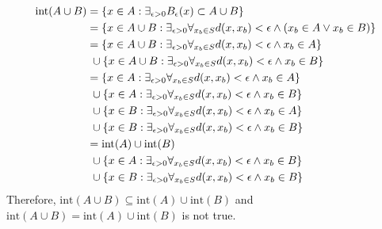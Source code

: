 \documentclass[]{article}
\begin{document}
\begin{align*}
    \text{int}(A \cup B) &= 
        \qty{x \in A : \exists_{\epsilon>0} B_\epsilon(x) \subset A \cup B}\\
    &= \qty{x \in A \cup B : 
        \exists_{\epsilon>0} \forall_{x_b \in S} d(x,x_b)<\epsilon 
        \land (x_b \in A \lor x_b \in B)}\\
    &= \qty{x \in A \cup B : 
            \exists_{\epsilon>0} \forall_{x_b \in S} d(x,x_b)<\epsilon 
            \land x_b \in A}\\
        &\ \cup \qty{x \in A \cup B : 
            \exists_{\epsilon>0} \forall_{x_b \in S} d(x,x_b)<\epsilon 
            \land x_b \in B}\\
    &= \qty{x \in A: \exists_{\epsilon>0} \forall_{x_b \in S} d(x,x_b)<\epsilon 
            \land x_b \in A}\\
        &\ \cup \qty{x \in A: 
            \exists_{\epsilon>0} \forall_{x_b \in S} d(x,x_b)<\epsilon 
            \land x_b \in B}\\
        &\ \cup \qty{x \in B : 
            \exists_{\epsilon>0} \forall_{x_b \in S} d(x,x_b)<\epsilon 
            \land x_b \in A}\\
        &\ \cup \qty{x \in B : 
            \exists_{\epsilon>0} \forall_{x_b \in S} d(x,x_b)<\epsilon 
            \land x_b \in B}\\
    &= \text{int}(A) \cup \text{int}(B)\\
        &\ \cup \qty{x \in A: 
            \exists_{\epsilon>0} \forall_{x_b \in S} d(x,x_b)<\epsilon 
            \land x_b \in B}\\
        &\ \cup \qty{x \in B : 
            \exists_{\epsilon>0} \forall_{x_b \in S} d(x,x_b)<\epsilon 
            \land x_b \in B}
\end{align*}
Therefore, $\text{int}(A\cup B) \subseteq \text{int}(A) \cup \text{int}(B)$ 
and $\text{int}(A\cup B) = \text{int}(A) \cup \text{int}(B)$ is not true.

\end{document}
